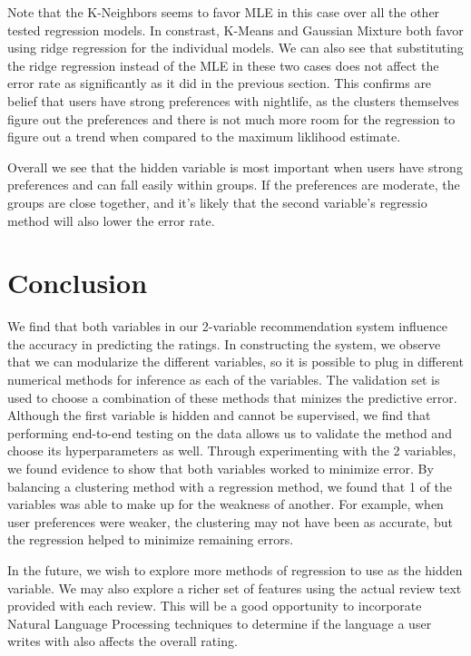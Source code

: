 \documentclass[11pt]{article}
\begin{document}
Note that the K-Neighbors seems to favor MLE in this case over all the other tested regression models. In constrast, K-Means and Gaussian Mixture both favor using ridge regression for the individual models. We can also see that substituting the ridge regression instead of the MLE in these two cases does not affect the error rate as significantly as it did in the previous section. This confirms are belief that users have strong preferences with nightlife, as the clusters themselves figure out the preferences and there is not much more room for the regression to figure out a trend when compared to the maximum liklihood estimate.

Overall we see that the hidden variable is most important when users have strong preferences and can fall easily within groups. If the preferences are moderate, the groups are close together, and it's likely that the second variable's regressio method will also lower the error rate.

\section{Conclusion}
We find that both variables in our 2-variable recommendation system influence the accuracy in predicting the ratings. In constructing the system, we observe that we can modularize the different variables, so it is possible to plug in different numerical methods for inference as each of the variables. The validation set is used to choose a combination of these methods that minizes the predictive error. Although the first variable is hidden and cannot be supervised, we find that performing end-to-end testing on the data allows us to validate the method and choose its hyperparameters as well. Through experimenting with the 2 variables, we found evidence to show that both variables worked to minimize error. By balancing a clustering method with a regression method, we found that 1 of the variables was able to make up for the weakness of another. For example, when user preferences were weaker, the clustering may not have been as accurate, but the regression helped to minimize remaining errors.

In the future, we wish to explore more methods of regression to use as the hidden variable. We may also explore a richer set of features using the actual review text provided with each review. This will be a good opportunity to incorporate Natural Language Processing techniques to determine if the language a user writes with also affects the overall rating.

\clearpage

\end{document}
